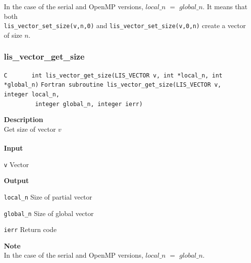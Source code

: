 \documentclass[a4paper]{article}
\newcommand{\namelistlabel}[1]{\mbox{#1}\hfill}
\newenvironment{namelist}[1]{%
 \begin{list}{}
  {\let\makelabel\namelistlabel
  \settowidth{\labelwidth}{#1}
  \setlength{\leftmargin}{1.1\labelwidth}}
}{%
\end{list}}
\begin{document}
In the case of the serial and OpenMP versions, $local\_n$ $=$ $global\_n$. 
It means that both \\
\verb|lis_vector_set_size(v,n,0)| and \verb|lis_vector_set_size(v,0,n)| 
create a vector of size $n$. 
  \subsubsection{lis\_vector\_get\_size}
\begin{screen}
\verb|C       int lis_vector_get_size(LIS_VECTOR v, int *local_n, int *global_n)|
\verb|Fortran subroutine lis_vector_get_size(LIS_VECTOR v, integer local_n,|\\
\verb|         integer global_n, integer ierr)|
\end{screen}
{\bf Description}\\
\indent
Get size of vector $v$
\\ \\
\noindent
{\bf Input}
\begin{namelist}{XXXXXXXXXXXXXXXXXXXX}
\item[\tt v] Vector
\end{namelist}
{\bf Output}
\begin{namelist}{XXXXXXXXXXXXXXXXXXXX}
\item[\tt local\_n] Size of partial vector
\item[\tt global\_n] Size of global vector
\item[\tt ierr] Return code
\end{namelist}
{\bf Note}\\
\indent
In the case of the serial and OpenMP versions, $local\_n$ $=$ $global\_n$. 
\end{document}
